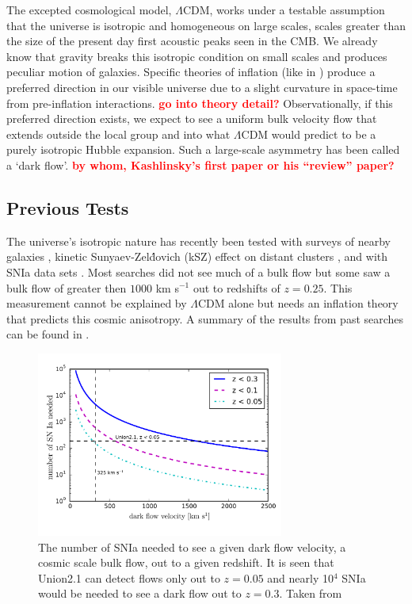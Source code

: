 \documentclass[apj, iop]{emulateapj}
\newcommand{\sn}{SNIa}
\newcommand{\todo}[1]{\textbf{\textcolor{red}{#1}}}
\begin{document}
The excepted cosmological model, $\Lambda$CDM, works under a testable assumption
that the universe is isotropic and homogeneous on large scales, scales greater
than the size of the present day first acoustic peaks seen in the CMB.
We already
know that gravity breaks this isotropic condition on small scales and produces
peculiar motion of galaxies. Specific theories of inflation (like in
\cite{MersiniHoughton:2008io}) produce a preferred direction in our visible
universe due to a slight curvature in space-time from pre-inflation
interactions. \todo{go into theory detail?} Observationally, if this preferred
direction exists, we expect to see a  uniform bulk velocity flow that extends
outside the local group and into what $\Lambda$CDM would predict to be a purely
isotropic Hubble expansion. Such a large-scale asymmetry has been called a `dark
flow'. \todo{by whom, Kashlinsky's first paper or his ``review'' paper?}

\subsection{Previous Tests}\label{previous-tests}

The universe's isotropic nature has recently been tested with surveys of nearby
galaxies \citep{Ma13}, kinetic Sunyaev-Zel\'{d}ovich (kSZ) effect on distant
clusters \citep{Kashlinsky10,Planckdf}, and with \sn{} data sets \citep[and others as seen in ]{Dai11,Rathaus13}.
Most searches did not see much of a bulk flow but some saw a bulk flow of
greater then $1000$ km s$^{-1}$ out to redshifts of $z = 0.25$. This measurement
cannot be explained by $\Lambda$CDM alone but needs an inflation theory that
predicts this cosmic anisotropy.  A summary of the results from past searches can be found in
.


\begin{figure}
	\includegraphics[width=3.2in]{what_dataset_size_v_velocity.pdf} 
	\caption{The number of \sn{} needed to see a given dark flow
	velocity, a cosmic scale bulk flow, out to a given redshift. It is seen that
	Union2.1 can detect flows only out to $z=0.05$ and nearly 10$^4$ \sn{} would be needed to
	see a dark flow out to $z=0.3$. Taken from \cite{Mathews16}}
	\label{f:sn-needed} 
\end{figure}
\end{document}
